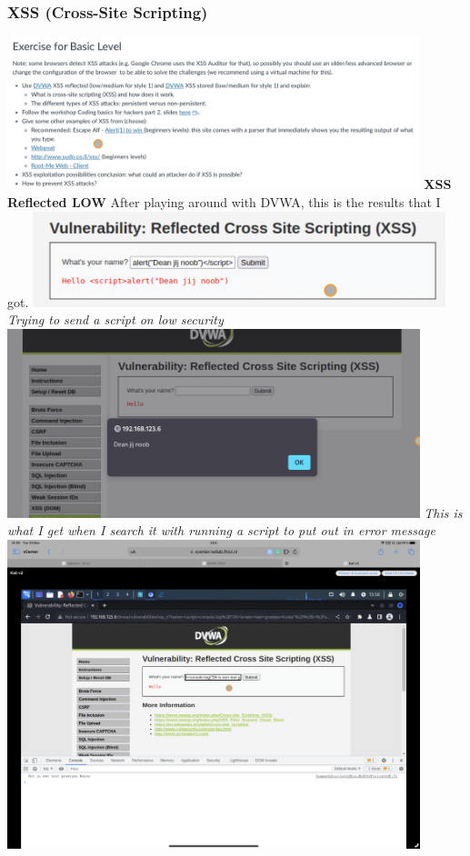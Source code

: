 \documentclass[12pt, letterpaper]{article}
\begin{document}
\subsubsection{XSS (Cross-Site Scripting)}
\includegraphics[width=0.9\textwidth]{fotos/Week 4/XSS basic.jpeg}
\hfill\break
\hfill\break
\textbf{XSS Reflected LOW}
\hfill\break
\hfill\break
After playing around with DVWA, this is the results that I got.
\hfill\break
\hfill\break
\includegraphics[width=0.9\textwidth]{fotos/Week 4/Xss/Reflected/Old/Low input text.jpeg}
\break
\emph{Trying to send a script on low security}
\hfill\break
\hfill\break
\includegraphics[width=0.9\textwidth]{fotos/Week 4/Xss/Reflected/Old/Low output text.jpeg}
\break
\emph{This is what I get when I search it with running a script to put out in error message}
\hfill\break
\hfill\break
\includegraphics[width=0.9\textwidth]{fotos/Week 4/Xss/Reflected/Console log output.png}
\end{document}
